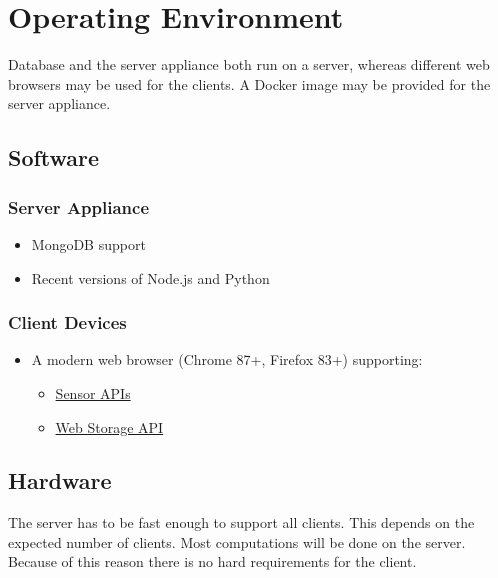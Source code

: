 \section{Operating Environment}
Database and the server appliance both run on a server, whereas different web browsers may be used for the clients. A Docker image may be provided for the server appliance.

\subsection{Software}
\subsubsection{Server Appliance}
\begin{itemize}
    \item MongoDB support
    \item Recent versions of Node.js and Python 
\end{itemize}
\subsubsection{Client Devices}
\begin{itemize}
    \item A modern web browser (Chrome 87+, Firefox 83+) supporting:
    \begin{itemize}
        \item \href{https://developer.mozilla.org/en-US/docs/Web/API/Sensor_APIs}{Sensor APIs}
        \item \href{https://developer.mozilla.org/en-US/docs/Web/API/Web_Storage_API}{Web Storage API}
    \end{itemize}
\end{itemize}

\subsection{Hardware} %
The server has to be fast enough to support all clients. This depends on the expected number of clients. Most computations will be done on the server. Because of this reason there is no hard requirements for the client.

